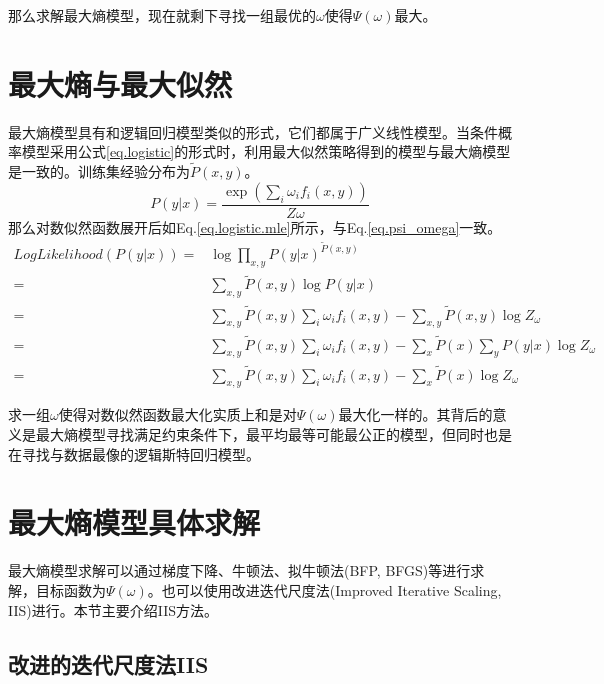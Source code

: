 \documentclass{article}
\begin{document}
   那么求解最大熵模型，现在就剩下寻找一组最优的$\omega$使得$\Psi(\omega)$最大。
   
   
   \section{最大熵与最大似然}
     最大熵模型具有和逻辑回归模型类似的形式，它们都属于广义线性模型。当条件概率模型采用公式\ref{eq.logistic}的形式时，利用最大似然策略得到的模型与最大熵模型是一致的。训练集经验分布为$\tilde{P}(x,y)$。
   \begin{equation}
   	P(y|x)=\frac{\exp{(\sum_{i}\omega_{i}f_{i}(x,y))}}{Z{\omega}} \label{eq.logistic}
   \end{equation}
   那么对数似然函数展开后如Eq.\ref{eq.logistic.mle}所示，与Eq.\ref{eq.psi_omega}一致。
   \begin{equation}
   		\begin{aligned}
   			LogLikelihood(P(y|x))=&\log{\prod_{x,y}P(y|x)^{\tilde{P}(x,y)}}\\
   			=&\sum_{x,y}\tilde{P}(x,y)\log{P(y|x)}\\
   			=&\sum_{x,y}\tilde{P}(x,y)\sum_{i}\omega_{i}f_{i}(x,y)-\sum_{x,y}\tilde{P}(x,y)\log{Z_{\omega}}\\
   			=&\sum_{x,y}\tilde{P}(x,y)\sum_{i}\omega_{i}f_{i}(x,y)-\sum_{x}\tilde{P}(x)\sum_{y}P(y|x)\log{Z_{\omega}}\\
   			=&\sum_{x,y}\tilde{P}(x,y)\sum_{i}\omega_{i}f_{i}(x,y)-\sum_{x}\tilde{P}(x)\log{Z_{\omega}} \label{eq.logistic.mle}
   		\end{aligned}
   \end{equation}

     求一组$\omega$使得对数似然函数最大化实质上和是对$\Psi(\omega)$最大化一样的。其背后的意义是最大熵模型寻找满足约束条件下，最平均最等可能最公正的模型，但同时也是在寻找与数据最像的逻辑斯特回归模型。
   
   \section{最大熵模型具体求解}
   
      最大熵模型求解可以通过梯度下降、牛顿法、拟牛顿法(BFP, BFGS)等进行求解，目标函数为$\Psi{(\omega)}$。也可以使用改进迭代尺度法(Improved Iterative Scaling, IIS)进行。本节主要介绍IIS方法。
   \subsection{改进的迭代尺度法IIS}
      
\end{document}
